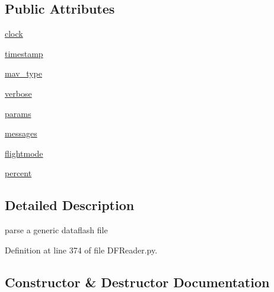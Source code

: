 \subsection*{Public Attributes}
\begin{DoxyCompactItemize}
\item 
\mbox{\hyperlink{classpymavlink_1_1DFReader_1_1DFReader_acd84fa97df078e2f2bc16e06904f73a0}{clock}}
\item 
\mbox{\hyperlink{classpymavlink_1_1DFReader_1_1DFReader_a736be07c12524b4c6cae6225e458e812}{timestamp}}
\item 
\mbox{\hyperlink{classpymavlink_1_1DFReader_1_1DFReader_a7f27c207bdc7b62333579d81bd92219b}{mav\+\_\+type}}
\item 
\mbox{\hyperlink{classpymavlink_1_1DFReader_1_1DFReader_abbad566e5d37a3d4582cbb7283a53feb}{verbose}}
\item 
\mbox{\hyperlink{classpymavlink_1_1DFReader_1_1DFReader_ab98bf6cb7dba82b6cad031b3676af9d6}{params}}
\item 
\mbox{\hyperlink{classpymavlink_1_1DFReader_1_1DFReader_a018083ea80aeb982d2f3bcb8fe8a4957}{messages}}
\item 
\mbox{\hyperlink{classpymavlink_1_1DFReader_1_1DFReader_af8c453df7a4226b12ee451a6742af34e}{flightmode}}
\item 
\mbox{\hyperlink{classpymavlink_1_1DFReader_1_1DFReader_a716dfb53a8ff2c2af70ce668998b1faa}{percent}}
\end{DoxyCompactItemize}


\subsection{Detailed Description}
\begin{DoxyVerb}parse a generic dataflash file\end{DoxyVerb}
 

Definition at line 374 of file D\+F\+Reader.\+py.



\subsection{Constructor \& Destructor Documentation}
\mbox{\label{classpymavlink_1_1DFReader_1_1DFReader_a61e0dac0ea04b561026a7430a4151e4d}} 
